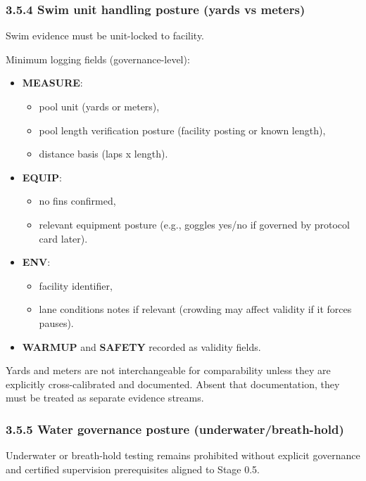 \documentclass[10pt]{article}
\begin{document}
\subsubsection*{3.5.4 Swim unit handling posture (yards vs meters)}

Swim evidence must be unit-locked to facility.

Minimum logging fields (governance-level):

\begin{itemize}
\item \textbf{MEASURE}:
  \begin{itemize}
  \item pool unit (yards or meters),
  \item pool length verification posture (facility posting or known length),
  \item distance basis (laps x length).
  \end{itemize}
\item \textbf{EQUIP}:
  \begin{itemize}
  \item no fins confirmed,
  \item relevant equipment posture (e.g., goggles yes/no if governed by protocol card later).
  \end{itemize}
\item \textbf{ENV}:
  \begin{itemize}
  \item facility identifier,
  \item lane conditions notes if relevant (crowding may affect validity if it forces pauses).
  \end{itemize}
\item \textbf{WARMUP} and \textbf{SAFETY} recorded as validity fields.
\end{itemize}

Yards and meters are not interchangeable for comparability unless they are explicitly cross-calibrated and documented. Absent that documentation, they must be treated as separate evidence streams.

\subsubsection*{3.5.5 Water governance posture (underwater/breath-hold)}

Underwater or breath-hold testing remains prohibited without explicit governance and certified supervision prerequisites aligned to Stage 0.5.
\end{document}
